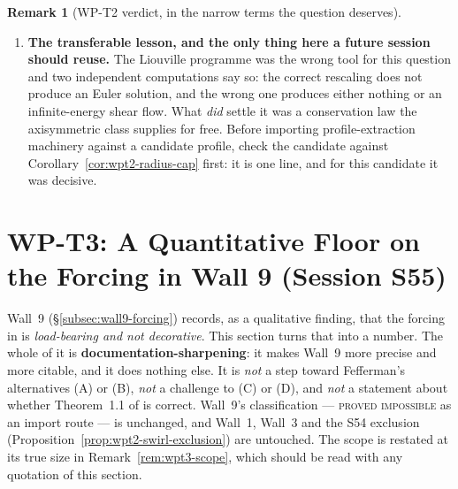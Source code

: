 \documentclass[11pt]{article}
\theoremstyle{definition}
\newtheorem{remark}[theorem]{Remark}
\theoremstyle{remark}
\begin{document}
\begin{remark}[WP-T2 verdict, in the narrow terms the question deserves]
\begin{enumerate}[label=\textup{(\arabic*)},leftmargin=2.4em]
      axisymmetric class, for the unforced equations. It is
      \textbf{not} progress toward (A) or (B); it is
      \textbf{not} a statement about \cite{OpenAI2026}, whose flow is forced
      and non-axisymmetric; it is \textbf{not} a constraint on Type-II
      blowup in general, since
      Corollary~\ref{cor:wpt2-radius-cap} is escaped by any core with
      $\ell_r\lesssim\tau^{1/2+h}$. Wall~1, Wall~3 and region~(R2) are
      exactly where \S\ref{sec:typeII-wpt1} left them.
    \item \textbf{The transferable lesson, and the only thing here a future
      session should reuse.} The Liouville programme was the wrong tool for
      this question and two independent computations say so: the correct
      rescaling does not produce an Euler solution, and the wrong one
      produces either nothing or an infinite-energy shear flow. What
      \emph{did} settle it was a conservation law the axisymmetric class
      supplies for free. Before importing profile-extraction machinery
      against a candidate profile, check the candidate against
      Corollary~\ref{cor:wpt2-radius-cap} first: it is one line, and for this
      candidate it was decisive.
  \end{enumerate}
\end{remark}

\section{WP-T3: A Quantitative Floor on the Forcing in Wall 9
  (Session S55)}
\label{sec:wpt3-forcing-floor}

Wall~9 (\S\ref{subsec:wall9-forcing}) records, as a qualitative finding, that
the forcing in \cite{OpenAI2026} is \emph{load-bearing and not decorative}.
This section turns that into a number. The whole of it is
\textbf{documentation-sharpening}: it makes Wall~9 more precise and more
citable, and it does nothing else. It is \emph{not} a step toward Fefferman's
alternatives (A) or (B), \emph{not} a challenge to (C) or (D), and \emph{not}
a statement about whether Theorem~1.1 of \cite{OpenAI2026} is correct. Wall~9's
classification --- \textsc{proved impossible} as an import route --- is
unchanged, and Wall~1, Wall~3 and the S54 exclusion
(Proposition~\ref{prop:wpt2-swirl-exclusion}) are untouched. The scope is
restated at its true size in Remark~\ref{rem:wpt3-scope}, which should be read
with any quotation of this section.
\end{document}
